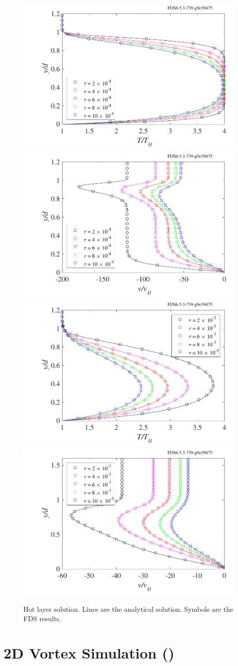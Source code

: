 \documentclass[11pt]{book}
\begin{document}
\begin{figure}[ht]
\centering
\includegraphics[width=.49\textwidth]{SCRIPT_FIGURES/hot_layer_temp_1}
\includegraphics[width=.49\textwidth]{SCRIPT_FIGURES/hot_layer_vel_1}
\includegraphics[width=.49\textwidth]{SCRIPT_FIGURES/hot_layer_temp_2}
\includegraphics[width=.49\textwidth]{SCRIPT_FIGURES/hot_layer_vel_2}
\caption[The {\ct hot\_layer\_collapse} test case]{Hot layer solution. Lines are the analytical solution.  Symbols are the FDS results.}
\label{fig_hot_layer}
\end{figure}


\clearpage


\section{2D Vortex Simulation (\texorpdfstring{}{vort2d})}
\label{two_dimensional_vortex}
\end{document}
